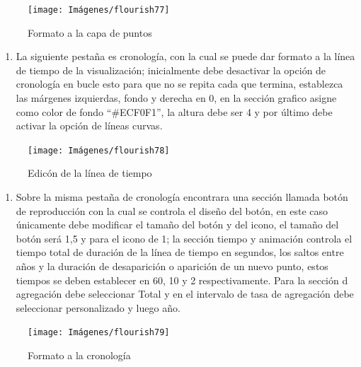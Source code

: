 \documentclass[
]{book}
\providecommand{\tightlist}{%
  \setlength{\itemsep}{0pt}\setlength{\parskip}{0pt}}
\begin{document}
\begin{figure}

{\centering \texttt{[image: Imágenes/flourish77]} 

}

\caption{Formato a la capa de puntos}\label{fig:paso7mapa3dflourish-fig}
\end{figure}

\begin{enumerate}
\def\labelenumi{\arabic{enumi}.}
\setcounter{enumi}{7}
\tightlist
\item
  La siguiente pestaña es cronología, con la cual se puede dar formato a la línea de tiempo de la visualización; inicialmente debe desactivar la opción de cronología en bucle esto para que no se repita cada que termina, establezca las márgenes izquierdas, fondo y derecha en 0, en la sección grafico asigne como color de fondo ``\#ECF0F1'', la altura debe ser 4 y por último debe activar la opción de líneas curvas.
\end{enumerate}

\begin{figure}

{\centering \texttt{[image: Imágenes/flourish78]} 

}

\caption{Edicón de la línea de tiempo}\label{fig:paso8mapa3dflourish-fig}
\end{figure}

\begin{enumerate}
\def\labelenumi{\arabic{enumi}.}
\setcounter{enumi}{8}
\tightlist
\item
  Sobre la misma pestaña de cronología encontrara una sección llamada botón de reproducción con la cual se controla el diseño del botón, en este caso únicamente debe modificar el tamaño del botón y del icono, el tamaño del botón será 1,5 y para el icono de 1; la sección tiempo y animación controla el tiempo total de duración de la línea de tiempo en segundos, los saltos entre años y la duración de desaparición o aparición de un nuevo punto, estos tiempos se deben establecer en 60, 10 y 2 respectivamente. Para la sección d agregación debe seleccionar Total y en el intervalo de tasa de agregación debe seleccionar personalizado y luego año.
\end{enumerate}

\begin{figure}

{\centering \texttt{[image: Imágenes/flourish79]} 

}

\caption{Formato a la cronología}\label{fig:paso9mapa3dflourish-fig}
\end{figure}
\end{document}
